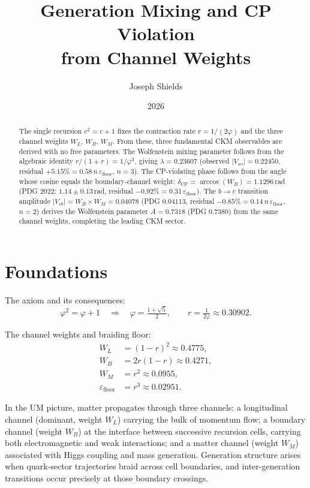\documentclass[12pt]{article}
\title{\textbf{Generation Mixing and CP Violation\\
from Channel Weights}}
\author{Joseph Shields}
\date{2026}
\begin{document}
\maketitle

\begin{abstract}
The single recursion $c^2 = c+1$ fixes the contraction rate $r = 1/(2\varphi)$
and the three channel weights $W_L$, $W_B$, $W_M$. From these, three
fundamental CKM observables are derived with no free parameters.
The Wolfenstein mixing parameter follows from the algebraic identity
$r/(1+r) = 1/\varphi^3$, giving $\lambda = 0.23607$ (observed $|V_{us}|
= 0.22450$, residual $+5.15\% = 0.58\,n\,\varepsilon_{\text{floor}}$, $n=3$).
The CP-violating phase follows from the angle whose cosine equals the
boundary-channel weight: $\delta_{\text{CP}} = \arccos(W_B) = 1.1296$\,rad
(PDG 2022: $1.14 \pm 0.13$\,rad, residual $-0.92\% = 0.31\,\varepsilon_{\text{floor}}$).
The $b \to c$ transition amplitude $|V_{cb}| = W_B \times W_M = 0.04078$
(PDG $0.04113$, residual $-0.85\% = 0.14\,n\,\varepsilon_{\text{floor}}$, $n=2$)
derives the Wolfenstein parameter $A = 0.7318$ (PDG $0.7380$) from the
same channel weights, completing the leading CKM sector.
\end{abstract}

\section{Foundations}

The axiom and its consequences:
\begin{equation}
  \varphi^2 = \varphi + 1
  \quad\Rightarrow\quad
  \varphi = \tfrac{1+\sqrt{5}}{2},\qquad
  r = \tfrac{1}{2\varphi} \approx 0.30902.
  \label{eq:axiom}
\end{equation}

The channel weights and braiding floor:
\begin{align}
  W_L &= (1-r)^2     \approx 0.4775, \label{eq:wl}\\
  W_B &= 2r(1-r)     \approx 0.4271, \label{eq:wb}\\
  W_M &= r^2         \approx 0.0955, \label{eq:wm}\\
  \varepsilon_{\text{floor}} &= r^3 \approx 0.02951. \label{eq:eps}
\end{align}

In the UM picture, matter propagates through three channels: a
longitudinal channel (dominant, weight $W_L$) carrying the bulk of
momentum flow; a boundary channel (weight $W_B$) at the interface between
successive recursion cells, carrying both electromagnetic and weak
interactions; and a matter channel (weight $W_M$) associated with Higgs
coupling and mass generation. Generation structure arises when quark-sector
trajectories braid across cell boundaries, and inter-generation transitions
occur precisely at those boundary crossings.
\end{document}
